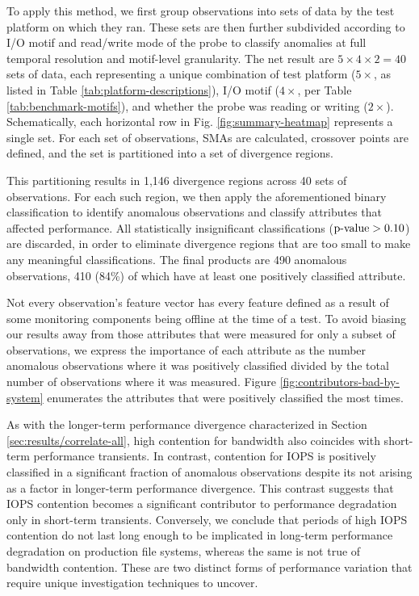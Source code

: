 To apply this method, we first group observations into sets of data by the test platform on which they ran.
These sets are then further subdivided according to I/O motif and read/write mode of the probe to classify anomalies at full temporal resolution and motif-level granularity.
The net result are $5 \times 4 \times 2 = 40$ sets of data, each representing a unique combination of test platform ($5 \times$, as listed in Table \ref{tab:platform-descriptions}), I/O motif ($4 \times$, per Table \ref{tab:benchmark-motifs}), and whether the probe was reading or writing ($2 \times$).
Schematically, each horizontal row in Fig. \ref{fig:summary-heatmap} represents a single set.
For each set of observations, SMAs are calculated, crossover points are defined, and the set is partitioned into a set of divergence regions.

This partitioning results in 1,146 divergence regions across 40 sets of observations.
For each such region, we then apply the aforementioned binary classification to identify anomalous observations and classify attributes that affected performance.
All statistically insignificant classifications ($\textup{p-value} > 0.10$) are discarded, in order to eliminate divergence regions that are too small to make any meaningful classifications. The final products are 
490 anomalous observations, 410 (84\%) of which have at least one positively classified attribute.

Not every observation's feature vector has every feature defined as a result of some monitoring components being offline at the time of a test.
To avoid biasing our results away from those attributes that were measured for only a subset of observations, we express the importance of each attribute as the number anomalous observations where it was positively classified divided by the total number of observations where it was measured.
Figure \ref{fig:contributors-bad-by-system} enumerates the attributes that were positively classified the most times.

As with the longer-term performance divergence characterized in Section \ref{sec:results/correlate-all}, high contention for bandwidth also coincides with short-term performance transients.
In contrast, contention for IOPS is positively classified in a significant fraction of anomalous observations despite its not arising as a factor in longer-term performance divergence.
This contrast suggests that IOPS contention  becomes a significant contributor to performance degradation only in short-term transients.
Conversely, we conclude that periods of high IOPS contention do not last long enough to be implicated in long-term performance degradation on production file systems, whereas the same is not true of bandwidth contention. These are two distinct forms of performance variation that
require unique investigation techniques to uncover.

